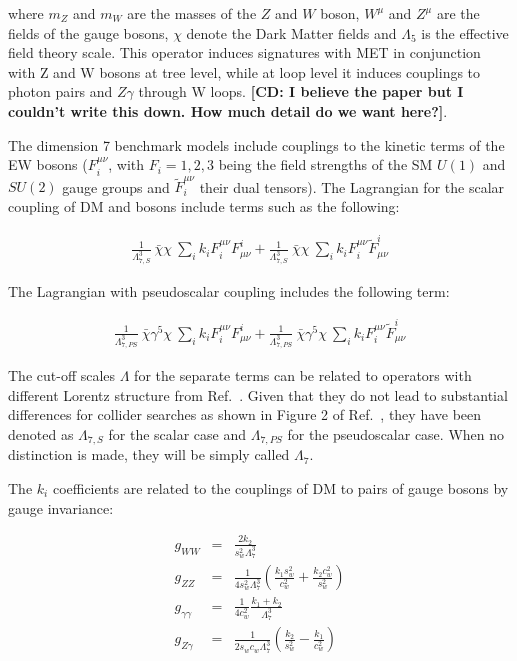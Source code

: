 where $m_Z$ and $m_W$ are the masses of the $Z$ and $W$ boson, $W^{\mu}$ and $Z^{\mu}$
are the fields of the gauge bosons, $\chi$ denote the Dark Matter fields 
and $\Lambda_5$ is the effective field theory scale. This operator 
induces signatures with MET in conjunction with Z and W bosons at tree level,
while at loop level it induces couplings to photon pairs and $Z \gamma$ through W loops. 
\textbf{[CD: I believe the paper but I couldn't write this down. How much detail do we want here?]}. 

The dimension 7 benchmark models include couplings to the kinetic
terms of the EW bosons ($F^{\mu\nu}_i$, with $F_i=1,2,3$ being the field strengths
of the SM $U(1)$ and $SU(2)$ gauge groups and $\tilde F^{\mu\nu}_i$ their dual tensors). 
The Lagrangian for the scalar coupling
of DM and bosons include terms such as the following:

\begin{eqnarray}
\frac{1}{\Lambda_{7,S}^3} ~\bar{\chi} \chi ~ \sum_i k_i  F_i^{\mu \nu} F^i_{\mu \nu} + 
\frac{1}{\Lambda_{7,S}^3} ~\bar{\chi} \chi ~ \sum_i k_i  F_i^{\mu \nu} \tilde F^i_{\mu \nu}
\end{eqnarray}

The Lagrangian with pseudoscalar coupling includes the following term:

\begin{eqnarray}
\frac{1}{\Lambda_{7,PS}^3} ~\bar{\chi} \gamma^5 \chi ~ \sum_i k_i  F_i^{\mu \nu} F^i_{\mu \nu} +
\frac{1}{\Lambda_{7,PS}^3} ~\bar{\chi} \gamma^5 \chi ~ \sum_i k_i  F_i^{\mu \nu} \tilde F^i_{\mu \nu}
\end{eqnarray}

The cut-off scales $\Lambda$ for the separate terms can be related to operators with different 
Lorentz structure from Ref.~\citep{Cotta:2012nj}. Given that they do not lead to 
substantial differences for collider searches as shown in Figure 2 of Ref.~\citep{Carpenter:2012rg}, 
they have been denoted as $\Lambda_{7,S}$ for the scalar case and  $\Lambda_{7,PS}$ for the pseudoscalar
case. When no distinction is made, they will be simply called $\Lambda_{7}$. 

The $k_i$ coefficients are related to the couplings of DM to pairs of gauge 
bosons by gauge invariance: 

\begin{eqnarray}
g_{WW}&=&\frac{2k_2}{s_w^2 \Lambda_7^3} \\
g_{ZZ} &=& \frac{1}{4 s_w^2 \Lambda_7^3} \left(\frac{k_1 s_w^2}{c_w^2}+\frac{k_2 c_w^2}{s_w^2} \right) \\
g_{\gamma\gamma}&=&\frac{1}{4 c_w^2}\frac{k_1+k_2}{\Lambda_7^3} \\
g_{Z\gamma} &=& \frac{1}{2 s_w c_w \Lambda_7^3} \left(\frac{k_2}{s_w^2}-\frac{k_1}{c_w^2} \right)
\label{eq:prefactors}
\end{eqnarray}

